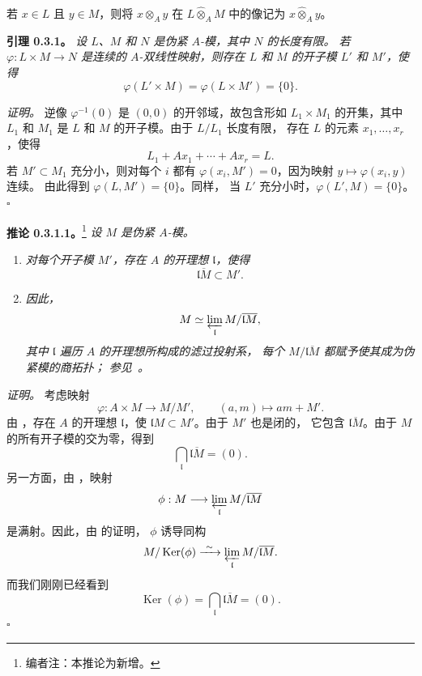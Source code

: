 若 \(x\in L\) 且 \(y\in M\)，则将 \(x\otimes_{A}y\) 在
\(L\widehat{\otimes}_{A}M\) 中的像记为 \(x\widehat{\otimes}_{A}y\)。

\medskip
\noindent\textbf{引理 0.3.1。}
\label{sga3:VIIB:0.3.1}
\textit{设 \(L\)、\(M\) 和 \(N\) 是伪紧 \(A\)-模，其中 \(N\) 的长度有限。
若 \(\varphi:L\times M\to N\) 是连续的 \(A\)-双线性映射，则存在
\(L\) 和 \(M\) 的开子模 \(L'\) 和 \(M'\)，使得}
\[
  \varphi(L'\times M)=\varphi(L\times M')=\{0\}.
\]

\noindent\textit{证明。}
逆像 \(\varphi^{-1}(0)\) 是 \((0,0)\) 的开邻域，故包含形如
\(L_{1}\times M_{1}\) 的开集，其中 \(L_{1}\) 和 \(M_{1}\) 是
\(L\) 和 \(M\) 的开子模。由于 \(L/L_{1}\) 长度有限，
存在 \(L\) 的元素 \(x_{1},\ldots,x_{r}\)，使得
\[
  L_{1}+Ax_{1}+\cdots+Ax_{r}=L.
\]
若 \(M'\subset M_{1}\) 充分小，则对每个 \(i\) 都有
\(\varphi(x_i,M')=0\)，因为映射 \(y\mapsto\varphi(x_i,y)\) 连续。
由此得到 \(\varphi(L,M')=\{0\}\)。同样，
当 \(L'\) 充分小时，\(\varphi(L',M)=\{0\}\)。
\hfill\(\square\)

\medskip
\noindent\textbf{推论 0.3.1.1。}\footnote{编者注：本推论为新增。}
\label{sga3:VIIB:0.3.1.1}
\textit{设 \(M\) 是伪紧 \(A\)-模。}
\begin{enumerate}
  \item[\textup{(i)}]
  \textit{对每个开子模 \(M'\)，存在 \(A\) 的开理想 \(\mathfrak l\)，使得}
  \[
    \overline{\mathfrak lM}\subset M'.
  \]

  \item[\textup{(ii)}]
  \textit{因此，}
  \[
    M\simeq
    \varprojlim_{\mathfrak l}
      M/\overline{\mathfrak lM},
  \]
  \textit{其中 \(\mathfrak l\) 遍历 \(A\) 的开理想所构成的滤过投射系，
  每个 \(M/\overline{\mathfrak lM}\) 都赋予使其成为伪紧模的商拓扑；
  参见\ 。}
\end{enumerate}

\noindent\textit{证明。}
考虑映射
\[
  \varphi:A\times M\longrightarrow M/M',
  \qquad
  (a,m)\longmapsto am+M'.
\]
由 ，存在 \(A\) 的开理想
\(\mathfrak l\)，使 \(\mathfrak lM\subset M'\)。由于 \(M'\) 也是闭的，
它包含 \(\overline{\mathfrak lM}\)。由于 \(M\) 的所有开子模的交为零，得到
\[
  \bigcap_{\mathfrak l}\overline{\mathfrak lM}=(0).
\]
另一方面，由 ，映射
\[
  \phi:M\longrightarrow
  \varprojlim_{\mathfrak l}M/\overline{\mathfrak lM}
\]
是满射。因此，由  的证明，
\(\phi\) 诱导同构
\[
  M/\operatorname{Ker}(\phi)
  \xrightarrow{\ \sim\ }
  \varprojlim_{\mathfrak l}M/\overline{\mathfrak lM}.
\]
而我们刚刚已经看到
\[
  \operatorname{Ker}(\phi)
  =
  \bigcap_{\mathfrak l}\overline{\mathfrak lM}
  =
  (0).
\]
\hfill\(\square\)

